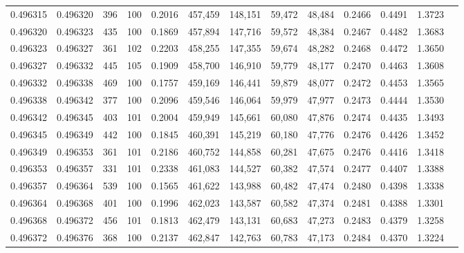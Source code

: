 \begin{tabular}{rrrrrrrrrrrrr}
0.496315 & 0.496320 &   396 & 100 &                                     0.2016 & 457,459 & 148,151 &  59,472 &  48,484 & 0.2466 & 0.4491 & 1.3723 \\
0.496320 & 0.496323 &   435 & 100 &                                     0.1869 & 457,894 & 147,716 &  59,572 &  48,384 & 0.2467 & 0.4482 & 1.3683 \\
0.496323 & 0.496327 &   361 & 102 &                                     0.2203 & 458,255 & 147,355 &  59,674 &  48,282 & 0.2468 & 0.4472 & 1.3650 \\
0.496327 & 0.496332 &   445 & 105 &                                     0.1909 & 458,700 & 146,910 &  59,779 &  48,177 & 0.2470 & 0.4463 & 1.3608 \\
0.496332 & 0.496338 &   469 & 100 &                                     0.1757 & 459,169 & 146,441 &  59,879 &  48,077 & 0.2472 & 0.4453 & 1.3565 \\
0.496338 & 0.496342 &   377 & 100 &                                     0.2096 & 459,546 & 146,064 &  59,979 &  47,977 & 0.2473 & 0.4444 & 1.3530 \\
0.496342 & 0.496345 &   403 & 101 &                                     0.2004 & 459,949 & 145,661 &  60,080 &  47,876 & 0.2474 & 0.4435 & 1.3493 \\
0.496345 & 0.496349 &   442 & 100 &                                     0.1845 & 460,391 & 145,219 &  60,180 &  47,776 & 0.2476 & 0.4426 & 1.3452 \\
0.496349 & 0.496353 &   361 & 101 &                                     0.2186 & 460,752 & 144,858 &  60,281 &  47,675 & 0.2476 & 0.4416 & 1.3418 \\
0.496353 & 0.496357 &   331 & 101 &                                     0.2338 & 461,083 & 144,527 &  60,382 &  47,574 & 0.2477 & 0.4407 & 1.3388 \\
0.496357 & 0.496364 &   539 & 100 &                                     0.1565 & 461,622 & 143,988 &  60,482 &  47,474 & 0.2480 & 0.4398 & 1.3338 \\
0.496364 & 0.496368 &   401 & 100 &                                     0.1996 & 462,023 & 143,587 &  60,582 &  47,374 & 0.2481 & 0.4388 & 1.3301 \\
0.496368 & 0.496372 &   456 & 101 &                                     0.1813 & 462,479 & 143,131 &  60,683 &  47,273 & 0.2483 & 0.4379 & 1.3258 \\
0.496372 & 0.496376 &   368 & 100 &                                     0.2137 & 462,847 & 142,763 &  60,783 &  47,173 & 0.2484 & 0.4370 & 1.3224 \\

\end{tabular}
